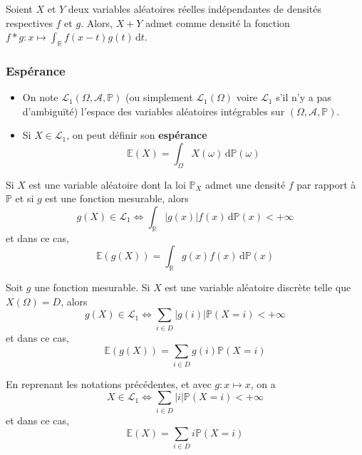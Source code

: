 
	\begin{theorem}
		Soient $X$ et $Y$ deux variables aléatoires réelles indépendantes de densités respectives $f$ et $g$. Alors, $X + Y$ admet comme densité la fonction $f * g : x \mapsto \int_{\mathbb{R}} f(x-t) g(t) \, \mathrm{d}t$.
	\end{theorem}

	\newpage

	\subsubsection{Espérance}


	\begin{definition}
		\begin{itemize}
			\item On note $\mathcal{L}_1(\Omega, \mathcal{A}, \mathbb{P})$ (ou simplement $\mathcal{L}_1(\Omega)$ voire $\mathcal{L}_1$ s'il n'y a pas d'ambiguïté) l'espace des variables aléatoires intégrables sur $(\Omega, \mathcal{A}, \mathbb{P})$.
			\item Si $X \in \mathcal{L}_1$, on peut définir son \textbf{espérance}
			\[ \mathbb{E}(X) = \int_\Omega X(\omega) \, \mathrm{d}\mathbb{P}(\omega) \]
		\end{itemize}
	\end{definition}


	\begin{theorem}[Transfert]
		Si $X$ est une variable aléatoire dont la loi $\mathbb{P}_X$ admet une densité $f$ par rapport à $\mathbb{P}$ et si $g$ est une fonction mesurable, alors
		\[ g(X) \in \mathcal{L}_1 \iff \int_{\mathbb{R}} \vert g(x) \vert f(x) \, \mathrm{d}\mathbb{P}(x) < +\infty \]
		et dans ce cas,
		\[ \mathbb{E}(g(X)) = \int_{\mathbb{R}} g(x) f(x) \, \mathrm{d}\mathbb{P}(x) \]
	\end{theorem}

	\begin{corollary}
		Soit $g$ une fonction mesurable. Si $X$ est une variable aléatoire discrète telle que $X(\Omega) = D$, alors
		\[ g(X) \in \mathcal{L}_1 \iff \sum_{i \in D} \vert g(i) \vert \mathbb{P}(X = i) < +\infty \]
		et dans ce cas,
		\[ \mathbb{E}(g(X)) = \sum_{i \in D} g(i) \mathbb{P}(X = i) \]
	\end{corollary}

	\begin{remark}
		En reprenant les notations précédentes, et avec $g : x \mapsto x$, on a
		\[ X \in \mathcal{L}_1 \iff \sum_{i \in D} \vert i \vert \mathbb{P}(X = i) < +\infty \]
		et dans ce cas,
		\[ \mathbb{E}(X) = \sum_{i \in D} i \mathbb{P}(X = i) \]
	\end{remark}

